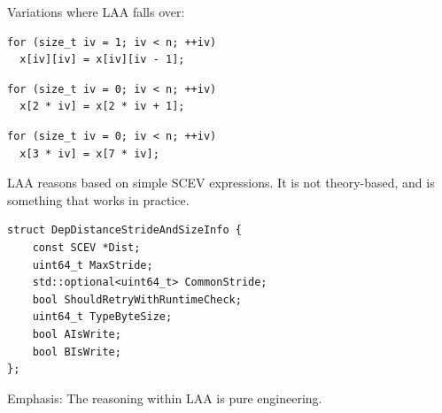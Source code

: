 \documentclass{beamer}
\begin{document}
\begin{frame}[containsverbatim]
  Variations where LAA falls over:

  \vspace{1em}

  \begin{verbatim}
for (size_t iv = 1; iv < n; ++iv)
  x[iv][iv] = x[iv][iv - 1];
  \end{verbatim}

  \vspace{1em}

  \begin{verbatim}
for (size_t iv = 0; iv < n; ++iv)
  x[2 * iv] = x[2 * iv + 1];
  \end{verbatim}

  \vspace{1em}

  \begin{verbatim}
for (size_t iv = 0; iv < n; ++iv)
  x[3 * iv] = x[7 * iv];
  \end{verbatim}

  \vspace{1em}

  LAA reasons based on simple SCEV expressions. It is not theory-based, and is something that works in practice.
\end{frame}

\begin{frame}[containsverbatim]
  \begin{verbatim}
struct DepDistanceStrideAndSizeInfo {
    const SCEV *Dist;
    uint64_t MaxStride;
    std::optional<uint64_t> CommonStride;
    bool ShouldRetryWithRuntimeCheck;
    uint64_t TypeByteSize;
    bool AIsWrite;
    bool BIsWrite;
};
  \end{verbatim}

  \vspace{1em}

  Emphasis: The reasoning within LAA is pure engineering.
\end{frame}
\end{document}
